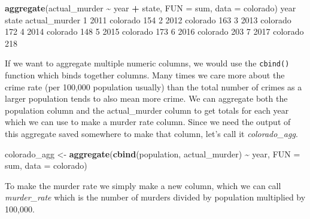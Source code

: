 \documentclass[
  12pt,
]{book}
\newenvironment{Shaded}{\begin{snugshade}}{\end{snugshade}}
\newcommand{\DataTypeTok}[1]{\textcolor[rgb]{0.27,0.27,0.27}{#1}}
\newcommand{\DecValTok}[1]{\textcolor[rgb]{0.06,0.06,0.06}{#1}}
\newcommand{\KeywordTok}[1]{\textcolor[rgb]{0.27,0.27,0.27}{\textbf{#1}}}
\newcommand{\NormalTok}[1]{#1}
\newcommand{\OperatorTok}[1]{\textcolor[rgb]{0.43,0.43,0.43}{\textbf{#1}}}
\newcommand{\StringTok}[1]{\textcolor[rgb]{0.5,0.5,0.5}{#1}}
\begin{document}
\begin{Shaded}
\begin{Highlighting}[]
\KeywordTok{aggregate}\NormalTok{(actual\_murder }\OperatorTok{\textasciitilde{}}\StringTok{ }\NormalTok{year }\OperatorTok{+}\StringTok{ }\NormalTok{state, }\DataTypeTok{FUN =}\NormalTok{ sum, }\DataTypeTok{data =}\NormalTok{ colorado)}
\NormalTok{  year    state actual\_murder}
\DecValTok{1} \DecValTok{2011}\NormalTok{ colorado           }\DecValTok{154}
\DecValTok{2} \DecValTok{2012}\NormalTok{ colorado           }\DecValTok{163}
\DecValTok{3} \DecValTok{2013}\NormalTok{ colorado           }\DecValTok{172}
\DecValTok{4} \DecValTok{2014}\NormalTok{ colorado           }\DecValTok{148}
\DecValTok{5} \DecValTok{2015}\NormalTok{ colorado           }\DecValTok{173}
\DecValTok{6} \DecValTok{2016}\NormalTok{ colorado           }\DecValTok{203}
\DecValTok{7} \DecValTok{2017}\NormalTok{ colorado           }\DecValTok{218}
\end{Highlighting}
\end{Shaded}

If we want to aggregate multiple numeric columns, we would use the \texttt{cbind()} function which binds together columns. Many times we care more about the crime rate (per 100,000 population usually) than the total number of crimes as a larger population tends to also mean more crime. We can aggregate both the population column and the actual\_murder column to get totals for each year which we can use to make a murder rate column. Since we need the output of this aggregate saved somewhere to make that column, let's call it \emph{colorado\_agg}.

\begin{Shaded}
\begin{Highlighting}[]
\NormalTok{colorado\_agg \textless{}{-}}\StringTok{ }\KeywordTok{aggregate}\NormalTok{(}\KeywordTok{cbind}\NormalTok{(population, actual\_murder) }\OperatorTok{\textasciitilde{}}\StringTok{ }\NormalTok{year, }\DataTypeTok{FUN =}\NormalTok{ sum, }\DataTypeTok{data =}\NormalTok{ colorado)}
\end{Highlighting}
\end{Shaded}

To make the murder rate we simply make a new column, which we can call \emph{murder\_rate} which is the number of murders divided by population multiplied by 100,000.

\begin{Shaded}
\end{Shaded}
\end{document}
